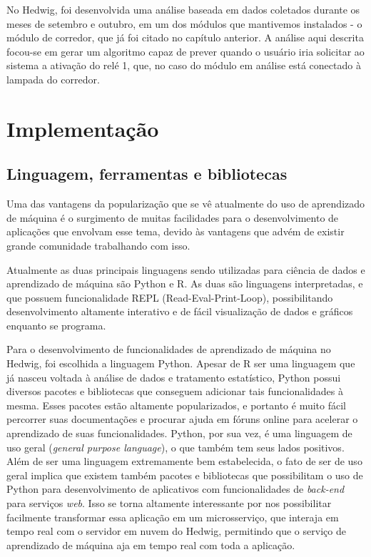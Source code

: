 		No Hedwig, foi desenvolvida uma análise baseada em dados coletados durante os meses de setembro e outubro, em um dos módulos que mantivemos instalados - o módulo de corredor, que já foi citado no capítulo anterior. A análise aqui descrita focou-se em gerar um algoritmo capaz de prever quando o usuário iria solicitar ao sistema a ativação do relé 1, que, no caso do módulo em análise está conectado à lampada do corredor.


	\section{Implementação}

		\subsection{Linguagem, ferramentas e bibliotecas}

			Uma das vantagens da popularização que se vê atualmente do uso de aprendizado de máquina é o surgimento de muitas facilidades para o desenvolvimento de aplicações que envolvam esse tema, devido às vantagens que advém de existir grande comunidade trabalhando com isso.

			Atualmente as duas principais linguagens sendo utilizadas para ciência de dados e aprendizado de máquina são Python e R. As duas são linguagens interpretadas, e que possuem funcionalidade REPL (Read-Eval-Print-Loop), possibilitando desenvolvimento altamente interativo e de fácil visualização de dados e gráficos enquanto se programa.

			Para o desenvolvimento de funcionalidades de aprendizado de máquina no Hedwig, foi escolhida a linguagem Python. Apesar de R ser uma linguagem que já nasceu voltada à análise de dados e tratamento estatístico, Python possui diversos pacotes e bibliotecas que conseguem adicionar tais funcionalidades à mesma. Esses pacotes estão altamente popularizados, e portanto é muito fácil percorrer suas documentações e procurar ajuda em fóruns online para acelerar o aprendizado de suas funcionalidades. Python, por sua vez, é uma linguagem de uso geral (\emph{general purpose language}), o que também tem seus lados positivos. Além de ser uma linguagem extremamente bem estabelecida, o fato de ser de uso geral implica que existem também pacotes e bibliotecas que possibilitam o uso de Python para desenvolvimento de aplicativos com funcionalidades de \emph{back-end} para serviços \emph{web}. Isso se torna altamente interessante por nos possibilitar facilmente transformar essa aplicação em um microsserviço, que interaja em tempo real com o servidor em nuvem do Hedwig, permitindo que o serviço de aprendizado de máquina aja em tempo real com toda a aplicação.

